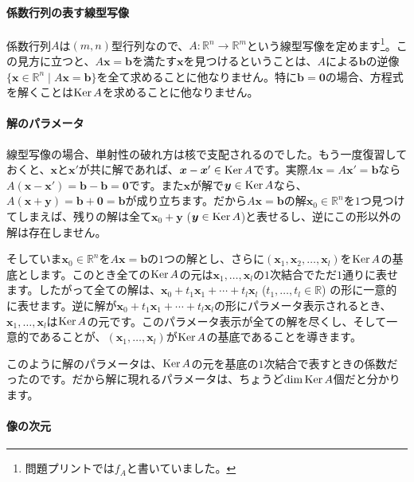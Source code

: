 \paragraph{係数行列の表す線型写像}

係数行列$A$は$(m, n)$型行列なので、$A\colon \mathbb{R}^n \rightarrow \mathbb{R}^m$という線型写像を定めます\footnote{問題プリントでは$f_A$と書いていました。}。この見方に立つと、$A\bm{x} = \bm{b}$を満たす$\bm{x}$を見つけるということは、$A$による$\bm{b}$の逆像$\{\bm{x} \in \mathbb{R}^n\mid A\bm{x} = \bm{b}\}$を全て求めることに他なりません。特に$\bm{b} = \bm{0}$の場合、方程式を解くことは$\operatorname{Ker} A$を求めることに他なりません。

\paragraph{解のパラメータ}

線型写像の場合、単射性の破れ方は核で支配されるのでした。もう一度復習しておくと、$\bm{x}$と$\bm{x}'$が共に解であれば、$\boldsymbol{x} - \boldsymbol{x}' \in \operatorname{Ker} A$です。実際$A\bm{x} = A\bm{x}' = \bm{b}$なら$A(\bm{x} - \bm{x}') = \bm{b} - \bm{b} = \bm{0}$です。また$\bm{x}$が解で$\boldsymbol{y} \in \operatorname{Ker} A$なら、$A(\bm{x} + \bm{y}) = \bm{b} + \bm{0} = \bm{b}$が成り立ちます。だから$A\bm{x} = \bm{b}$の解$\bm{x}_0 \in \mathbb{R}^n$を$1$つ見つけてしまえば、残りの解は全て$\bm{x}_0 + \bm{y}$ ($\boldsymbol{y} \in \operatorname{Ker} A$)と表せるし、逆にこの形以外の解は存在しません。

そしていま$\bm{x}_0\in\mathbb{R}^n$を$A\bm{x} = \bm{b}$の$1$つの解とし、さらに$(\bm{x}_1, \bm{x}_2, \ldots, \bm{x}_l)$を$\operatorname{Ker} A$の基底とします。このとき全ての$\operatorname{Ker} A$の元は$\bm{x}_1, \ldots, \bm{x}_l$の$1$次結合でただ$1$通りに表せます。したがって全ての解は、$\bm{x}_0 + t_1 \bm{x}_1 + \cdots + t_l \bm{x}_l$ ($t_1, \ldots, t_l \in \mathbb{R}$) の形に一意的に表せます。逆に解が$\bm{x}_0 + t_1 \bm{x}_1 + \cdots + t_l \bm{x}_l$の形にパラメータ表示されるとき、$\bm{x}_1, \ldots, \bm{x}_l$は$\operatorname{Ker} A$の元です。このパラメータ表示が全ての解を尽くし、そして一意的であることが、$(\bm{x}_1, \ldots, \bm{x}_l)$が$\operatorname{Ker} A$の基底であることを導きます。

このように解のパラメータは、$\operatorname{Ker} A$の元を基底の$1$次結合で表すときの係数だったのです。だから解に現れるパラメータは、ちょうど$\dim \operatorname{Ker} A$個だと分かります。

\paragraph{像の次元}

